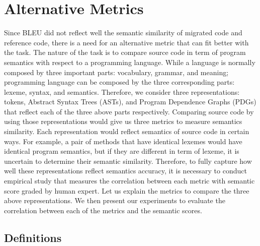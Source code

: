 \section{Alternative Metrics}
\label{sec:alternatives}
Since BLEU did not reflect well the semantic similarity of migrated
code and reference code, there is a need for an alternative metric
that can fit better with the task. The nature of the task is to
compare source code in term of program semantics with respect to a
programming language.
%
While a language is normally composed by three important parts:
vocabulary, grammar, and meaning; programming language can be composed
by the three corresponding parts: lexeme, syntax, and
semantics. 
%
Therefore, we consider three representations: tokens, Abstract Syntax Trees
(ASTs), and Program Dependence Graphs (PDGs) that reflect each of the
three above parts respectively. Comparing source code by using those representations would give us three metrics to measure semantics similarity. Each representation would reflect semantics of source code in certain ways.
For example, a pair of methods that have identical lexemes would have identical program semantics, but if they are different in term of lexeme, it is uncertain to determine their semantic similarity. Therefore, to fully capture how well these representations reflect semantics accuracy, it is necessary to conduct empirical study that measures the correlation between each metric with semantic score graded by human expert.
%
Let us explain the metrics to compare the three above representations.
%
We then present our experiments to evaluate the correlation between
each of the metrics and the semantic scores.


\subsection{Definitions}

